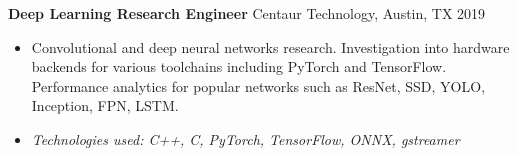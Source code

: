\textbf{Deep Learning Research Engineer}
 Centaur Technology, Austin, TX \hfill 2019

\begin{itemize} \itemsep -2pt

\item Convolutional and deep neural networks research. Investigation into
      hardware backends for various toolchains including PyTorch and
      TensorFlow. Performance analytics for popular networks such as ResNet,
      SSD, YOLO, Inception, FPN, LSTM.

\item \textit{Technologies used: C++, C, PyTorch, TensorFlow, ONNX, gstreamer}

\end{itemize}
